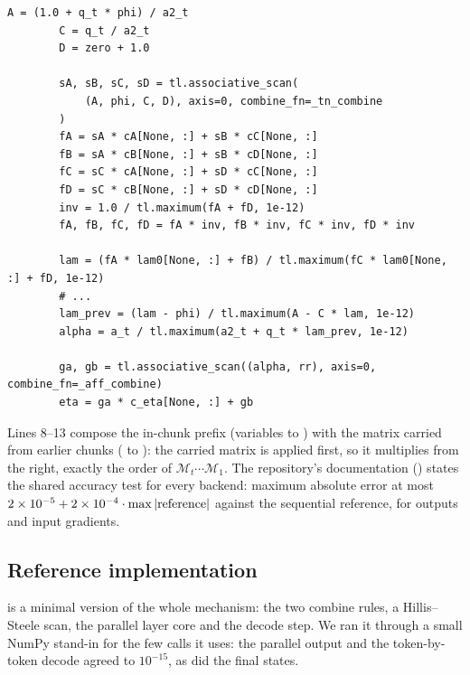 \begin{lstlisting}[caption={Excerpt from \texttt{repos/\allowbreak vaisakh-shaj\_\_kalman-linear-attention/\allowbreak src/\allowbreak kla/\allowbreak ops/\allowbreak kernels/\allowbreak triton/\allowbreak fused\_kla\_scan.py} (inside the chunk loop of \texttt{\_fused\_fwd\_kernel}). One non-ASCII comment line is elided.},label={lst:c08-kla-fused}]
        A = (1.0 + q_t * phi) / a2_t
        C = q_t / a2_t
        D = zero + 1.0

        sA, sB, sC, sD = tl.associative_scan(
            (A, phi, C, D), axis=0, combine_fn=_tn_combine
        )
        fA = sA * cA[None, :] + sB * cC[None, :]
        fB = sA * cB[None, :] + sB * cD[None, :]
        fC = sC * cA[None, :] + sD * cC[None, :]
        fD = sC * cB[None, :] + sD * cD[None, :]
        inv = 1.0 / tl.maximum(fA + fD, 1e-12)
        fA, fB, fC, fD = fA * inv, fB * inv, fC * inv, fD * inv

        lam = (fA * lam0[None, :] + fB) / tl.maximum(fC * lam0[None, :] + fD, 1e-12)
        # ...
        lam_prev = (lam - phi) / tl.maximum(A - C * lam, 1e-12)
        alpha = a_t / tl.maximum(a2_t + q_t * lam_prev, 1e-12)

        ga, gb = tl.associative_scan((alpha, rr), axis=0, combine_fn=_aff_combine)
        eta = ga * c_eta[None, :] + gb
\end{lstlisting}

Lines 8--13 compose the in-chunk prefix (variables  to ) with the matrix
carried from earlier chunks ( to ): the carried matrix is applied first, so it multiplies from the right, exactly the
order of $\mathcal{M}_t\cdots\mathcal{M}_1$. The repository's documentation ()
states the shared accuracy test for every backend: maximum absolute error at most
$2\times10^{-5}+2\times10^{-4}\cdot\max\left\lvert \text{reference}\right\rvert$ against the sequential reference, for
outputs and input gradients.

\subsection{Reference implementation}

 is a minimal version of the whole mechanism: the two combine rules, a
Hillis--Steele scan, the parallel layer core and the decode step. We ran it through a small NumPy
stand-in for the few  calls it uses: the parallel output and the token-by-token decode
agreed to $10^{-15}$, as did the final states.

